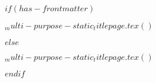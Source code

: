 $if(has-frontmatter)$
  \begin{frontmatter}
    \begin{titlepage}
      $_multi-purpose-static_titlepage.tex()$
    \end{titlepage}
  \end{frontmatter}
$else$
  \begin{titlepage}
    $_multi-purpose-static_titlepage.tex()$
  \end{titlepage}
$endif$
